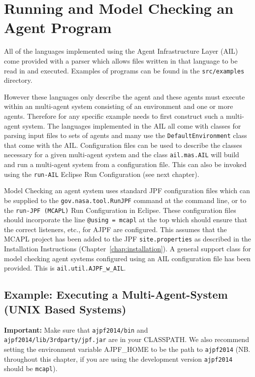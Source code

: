 \chapter{Running and Model Checking an Agent Program}
\label{chap:running}

All of the languages implemented using the Agent Infrastructure Layer (AIL) come provided with a parser which allows files written in that language to be read in and executed.  Examples of programs can be found in the \texttt{src/examples} directory.

However these languages only describe the agent and these agents must execute within an multi-agent system consisting of an environment and one or more agents.  Therefore for any specific example needs to first construct such a multi-agent system.  The languages implemented in the AIL all come with classes for parsing input files to sets of agents and many use the \texttt{DefaultEnvironment} class that come with the AIL. Configuration files can be used to describe the classes necessary  for a given multi-agent system and the class \texttt{ail.mas.AIL} will build and run a multi-agent system from a configuration file.  This can also be invoked using the \texttt{run-AIL} Eclipse Run Configuration (see next chapter).

Model Checking an agent system uses standard JPF configuration files which can be supplied to the \texttt{gov.nasa.tool.RunJPF} command at the command line, or to the \texttt{run-JPF (MCAPL)} Run Configuration in Eclipse.  These configuration files should incorporate the line \texttt{@using = mcapl} at the top which should ensure that the correct listeners, etc., for AJPF are configured.  This assumes that the MCAPL project has been added to the JPF \texttt{site.properties} as described in the Installation Instructions (Chapter~\ref{chap:installation}).  A general support class for model checking agent systems configured using an AIL configuration file has been provided.  This is \texttt{ail.util.AJPF\_w\_AIL}. 

\section{Example: Executing a Multi-Agent-System (UNIX Based Systems)}
{\bf Important:} Make sure that \texttt{ajpf2014/bin} and \texttt{ajpf2014/lib/3rdparty/jpf.jar} are in your CLASSPATH.  We also recommend setting the environment variable AJPF\_HOME to be the path to \texttt{ajpf2014} (NB. throughout this chapter, if you are using the development version \texttt{ajpf2014} should be \texttt{mcapl}).


